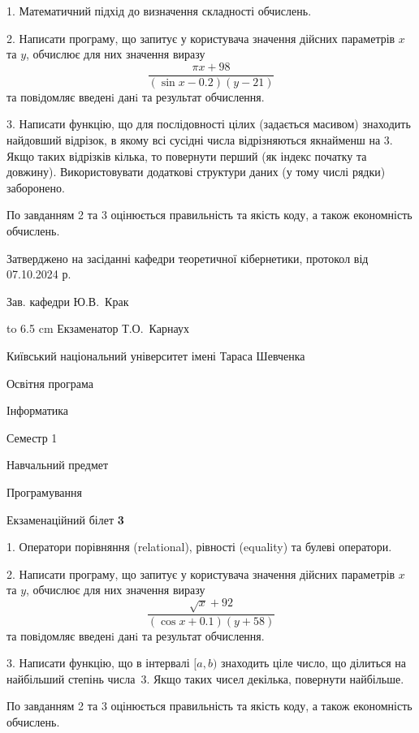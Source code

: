 \documentclass[12pt, ukrainian]{article}
\begin{document}
{%
1. Математичний підхід до визначення складності обчислень.%
\par
2. Написати програму, що запитує у користувача значення дійсних параметрів $x$ та $y$, обчислює для них значення виразу 
$$\frac{\pi x + 98}{(\sin x - 0.2) (y - 21)}$$ 
та повiдомляє введенi данi та результат обчислення.

\par
3. Написати функцію, що для послідовності цілих (задається масивом) знаходить найдовший відрізок, в якому всі сусідні числа відрізняються якнайменш на 3. Якщо таких відрізків кілька, то повернути перший (як індекс початку та довжину). Використовувати додаткові структури даних (у тому числі рядки) заборонено.

По завданням 2 та 3 оцінюється правильність та якість коду, а також економність обчислень.

}
{\smallskip\smallskip \begin {scriptsize} Затверджено на засіданні кафедри теоретичної кібернетики, протокол   від   07.10.2024 р.\par\smallskip\smallskip\smallskip\smallskip
{\parbox {6.5 cm} {Зав. кафедри \dotfill Ю.В.~Крак}}\hspace {0.7cm} {\hbox to 6.5 cm { Екзаменатор \dotfill Т.О.~Карнаух}} \end{scriptsize}}
\vspace{0.9cm}
{{\begin {scriptsize}\par
{ \center  Київський національний університет імені Тараса Шевченка \par}
{\parbox {5 cm}{Освітня програма \hfill}{\parbox {7 cm}{Інформатика\hfill}}\parbox {6 cm}{\hfill Семестр 1}}\par
{\parbox {5 cm} {Навчальний предмет \hfill}\parbox {7 cm}{Програмування \hfill}\parbox {6cm}{\hfill}\par}\vspace{-15pt} \end{scriptsize}}{\center Екзаменаційний білет \No \textbf { 3 }\par}}
{%
1. Оператори порівняння (relational), рівності (equality) та булеві оператори.%
\par
2. Написати програму, що запитує у користувача значення дійсних параметрів $x$ та $y$, обчислює для них значення виразу 
$$\frac{\sqrt x + 92}{(\cos x + 0.1) (y + 58)}$$ 
та повiдомляє введенi данi та результат обчислення.

\par
3. Написати функцію, що в інтервалі $[a, b)$ знаходить ціле число, що ділиться на найбільший степінь числа 3. Якщо таких чисел декілька, повернути найбільше.

По завданням 2 та 3 оцінюється правильність та якість коду, а також економність обчислень.

}
\end{document}
